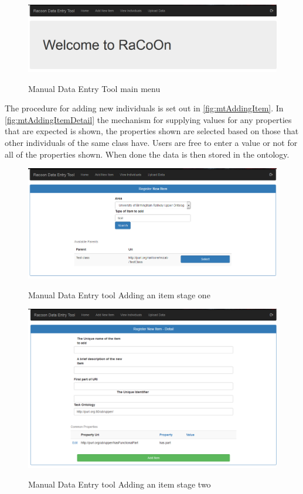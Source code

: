  \begin{figure}[!h]
\myfloatalign
{\includegraphics[max height=0.5\textheight,max width=\linewidth]{gfx/manToolInUse}} 
\caption[Manual Data Entry Tool]{Manual Data Entry Tool main menu}
\label{fig:mtMainMenu}
\end{figure}

The procedure for adding new individuals is set out in \autoref{fig:mtAddingItem}. In \autoref{fig:mtAddingItemDetail} the mechanism for supplying values for any properties that are expected is shown, the properties shown are selected based on those that other individuals of the same class have. Users are free to enter a value or not for all of the properties shown. When done the data is then stored in the ontology.

 \begin{figure}[!h]
\myfloatalign
{\includegraphics[max height=0.5\textheight,max width=\linewidth]{gfx/manToolAddingItem}} 
\caption[Manual Data Entry Tool Add item stage 1]{Manual Data Entry tool Adding an item stage one}
\label{fig:mtAddingItem}
\end{figure}

 \begin{figure}[!h]
\myfloatalign
{\includegraphics[max height=0.5\textheight,max width=\linewidth]{gfx/addItemDetail}} 
\caption[Manual Data Entry Tool Add item stage 2]{Manual Data Entry tool Adding an item stage two}
\label{fig:mtAddingItemDetail}
\end{figure}


